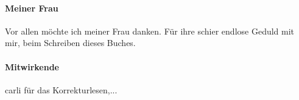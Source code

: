 \paragraph{Meiner Frau}
Vor allen möchte ich meiner Frau danken. Für ihre schier endlose Geduld mit mir, beim Schreiben dieses Buches.

\paragraph{Mitwirkende}  
carli für das Korrekturlesen,...